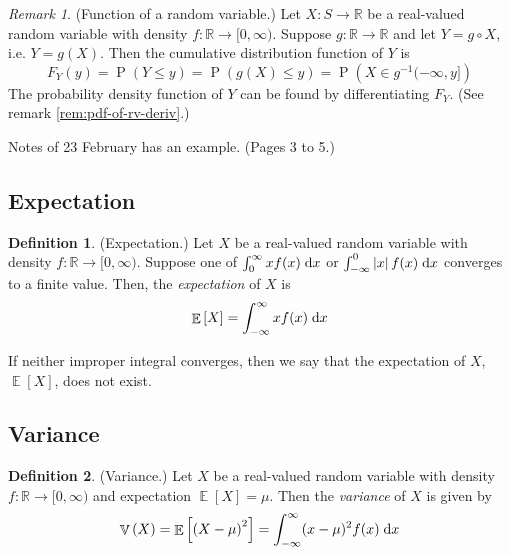 \documentclass[11pt]{article}
\theoremstyle{definition}
\newtheorem{defn}{Definition}[section]
\theoremstyle{remark}
\newtheorem{rem}{Remark}[section]
\newcommand{\parens}[1]{\left(#1\right)}
\newcommand{\abs}[1]{\left\lvert#1\right\rvert}
\newcommand{\inv}{^{-1}}
\renewcommand{\d}{\mathrm{d}}
\newcommand{\intd}{\;\d}
\newcommand{\infinfint}{%
    \ensuremath \int_{-\infty}^{\infty}
}
\newcommand{\intfrominf}{%
    \ensuremath \int_{-\infty}
}
\newcommand{\inttoinf}{%
    \ensuremath \int^{\infty}
}
\newcommand{\R}{\mathbb{R}}
\DeclareMathOperator{\Prob}{P}
\renewcommand{\P}[1]{\Prob{\parens{#1}}}
\DeclareMathOperator{\Expect}{\mathbb{E}}
\newcommand{\E}[1]{\Expect{\left[#1\right]}}
\DeclareMathOperator{\Var}{\mathbb{V}}
\newcommand{\V}[1]{\Var{\parens{#1}}}
\newcommand{\cdf}{cumulative distribution function}
\newcommand{\pdf}{probability density function}
\begin{document}
\begin{rem}{(Function of a random variable.)}
    \label{rem:function-of-cts-rv}
    Let $X : S \to \R$ be a real-valued random variable with density
    $f : \R \to [0, \infty)$.
    Suppose $g : \R \to \R$ and let $Y = g \circ X$, i.e. $Y = g(X)$.
    Then the \cdf{} of $Y$ is
    \begin{equation}
        \label{eq:function-of-cts-rv}
        F_Y (y)
        = \P{Y \leq y}
        = \P{g(X) \leq y}
        = \P{X \in g\inv(-\infty, y]}
    \end{equation}
    The \pdf{} of $Y$ can be found by differentiating $F_Y$.
    (See remark \ref{rem:pdf-of-rv-deriv}.)
\end{rem}

Notes of 23 February has an example. (Pages 3 to 5.)

\subsection{Expectation}

\begin{defn}{(Expectation.)}
    \label{def:expectation-cts}
    Let $X$ be a real-valued random variable with density
    $f : \R \to [0, \infty)$.
    Suppose one of
    $\inttoinf_0 x f(x) \intd x$ or $\intfrominf^0 \abs{x} f(x) \intd x$
    converges to a finite value.
    Then, the \emph{expectation} of $X$ is
    \begin{equation}
        \label{eq:expectation-cts}
        \E{X} = \infinfint x f(x) \intd x
    \end{equation}

    If neither improper integral converges, then we say that the expectation of
    $X$, $\E{X}$, does not exist.
\end{defn}

\subsection{Variance}

\begin{defn}{(Variance.)}
    \label{def:variance-cts}
    Let $X$ be a real-valued random variable with density
    $f : \R \to [0, \infty)$ and expectation $\E{X} = \mu$.
    Then the \emph{variance} of $X$ is given by
    \begin{equation}
        \label{eq:variance-cts}
        \V{X}
        = \E{\parens{X - \mu}^2}
        = \infinfint (x - \mu)^2 f(x) \intd x
    \end{equation}
\end{defn}
\end{document}
